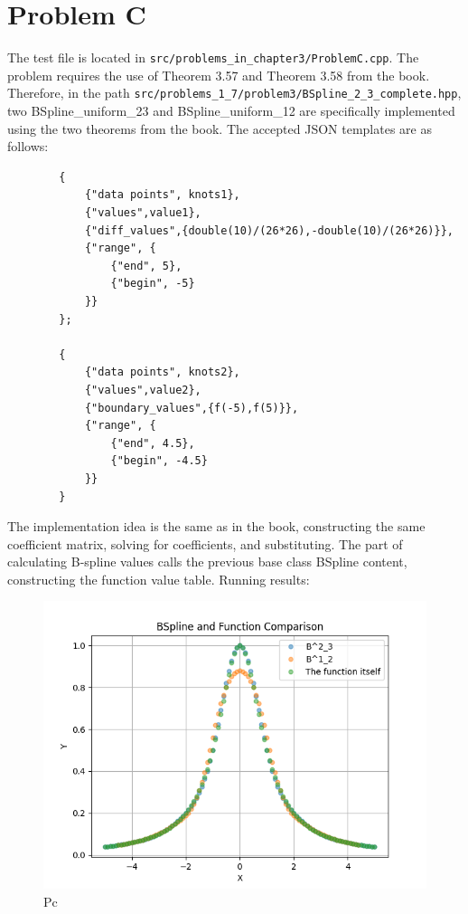 \documentclass[a4paper]{article}
\begin{document}
\section*{Problem C}
    The test file is located in \texttt{src/problems\_in\_chapter3/ProblemC.cpp}.
    The problem requires the use of Theorem 3.57 and Theorem 3.58 from the book.
    Therefore, in the path \texttt{src/problems\_1\_7/problem3/BSpline\_2\_3\_complete.hpp},
    two BSpline\_uniform\_23 and BSpline\_uniform\_12 are specifically implemented using the two theorems from the book.
    The accepted JSON templates are as follows:
    \begin{verbatim}
        {
            {"data points", knots1},
            {"values",value1},
            {"diff_values",{double(10)/(26*26),-double(10)/(26*26)}},
            {"range", {
                {"end", 5},
                {"begin", -5}
            }}
        };
    
        {
            {"data points", knots2},
            {"values",value2},
            {"boundary_values",{f(-5),f(5)}},
            {"range", {
                {"end", 4.5},
                {"begin", -4.5}
            }}
        }
    \end{verbatim}
    The implementation idea is the same as in the book, constructing the same coefficient matrix, solving for coefficients, and substituting.
    The part of calculating B-spline values calls the previous base class BSpline content, constructing the function value table.
    Running results:
    \begin{figure}[H] 
        \centering
        \includegraphics{../figure/Pc.png} 
        \caption{Pc} 
    \end{figure}
    
\end{document}

